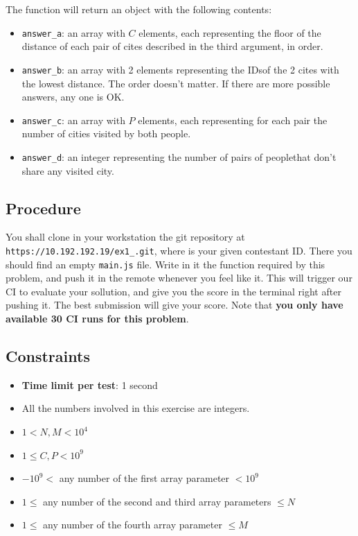 \documentclass{article}
\begin{document}
The function will return an object with the following contents:
\begin{itemize}
	\item \verb|answer_a|: an array with $C$ elements, each representing the floor of the distance of each pair of cites described in the third argument, in order.
	\item \verb|answer_b|: an array with 2 elements representing the IDs\footnotemark[2] of the 2 cites with the lowest distance. The order doesn't matter. If there are more possible answers, any one is OK.
	\item \verb|answer_c|: an array with $P$ elements, each representing for each pair the number of cities visited by both people.
	\item \verb|answer_d|: an integer representing the number of pairs of people\footnotemark[1] that don't share any visited city.
\end{itemize}

\subsection*{Procedure}
You shall clone in your workstation the git repository at \verb|https://10.192.192.19/ex1_|\verb|.git|, where  is your given contestant ID.
There you should find an empty \verb|main.js| file. Write in it the function required by this problem, and push it in the remote whenever you feel like it.
This will trigger our CI to evaluate your sollution, and give you the score in the terminal right after pushing it. The best submission will give your score. Note that \textbf{you only have available 30 CI runs for this problem}.

\subsection*{Constraints}
\begin{itemize}
	\item \textbf{Time limit per test}: 1 second
	\item All the numbers involved in this exercise are integers.
	\item $1 < N, M < 10^4$
	\item $1 \leq C, P < 10^9$
	\item $-10^9 <$ any number of the first array parameter $< 10^9$
	\item $1 \leq$ any number of the second and third array parameters $\leq N$
	\item $1 \leq$ any number of the fourth array parameter $\leq M$
\end{itemize}
\end{document}
